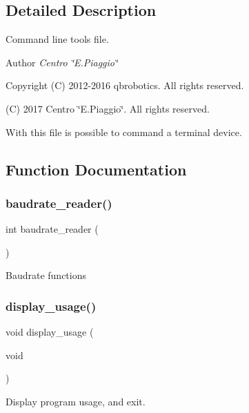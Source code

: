 \subsection{Detailed Description}
Command line tools file. 

\begin{DoxyAuthor}{Author}
{\itshape Centro \char`\"{}\+E.\+Piaggio\char`\"{}} 
\end{DoxyAuthor}
\begin{DoxyCopyright}{Copyright}
(C) 2012-\/2016 qbrobotics. All rights reserved. 

(C) 2017 Centro \char`\"{}\+E.\+Piaggio\char`\"{}. All rights reserved.
\end{DoxyCopyright}
With this file is possible to command a terminal device. 

\subsection{Function Documentation}
\mbox{\label{qbadmin_8c_a872d84bb02f7d8f4617246f0c6d37c43}} 
\subsubsection{baudrate\+\_\+reader()}
{\footnotesize\ttfamily int baudrate\+\_\+reader (\begin{DoxyParamCaption}{ }\end{DoxyParamCaption})}

Baudrate functions \mbox{\label{qbadmin_8c_acf5088e61b616f77674f62a9ba3b86b7}} 
\subsubsection{display\+\_\+usage()}
{\footnotesize\ttfamily void display\+\_\+usage (\begin{DoxyParamCaption}\item[{void}]{ }\end{DoxyParamCaption})}

Display program usage, and exit. \mbox{\label{qbadmin_8c_a98a5d602fbf649e7f9e8f851cb757f71}} 
